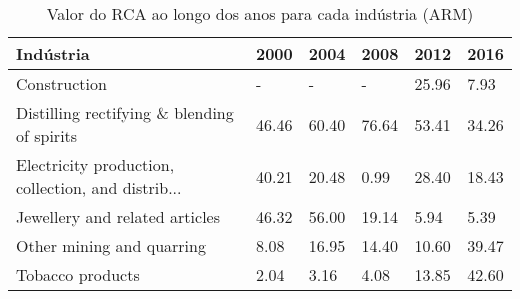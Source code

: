 \begin{table}
\centering
\caption{Valor do RCA ao longo dos anos para cada indústria (ARM)}
\label{tab:ex3-tempo-ARM}
\begin{tabular}{p{6cm}p{1.5cm}p{1.5cm}p{1.5cm}p{1.5cm}p{1.5cm}}
\toprule
                                         Indústria &  2000 &  2004 &  2008 &  2012 &  2016 \\
\midrule
                                      Construction &     - &     - &     - & 25.96 &  7.93 \\
       Distilling rectifying \& blending of spirits & 46.46 & 60.40 & 76.64 & 53.41 & 34.26 \\
Electricity production, collection, and distrib... & 40.21 & 20.48 &  0.99 & 28.40 & 18.43 \\
                    Jewellery and related articles & 46.32 & 56.00 & 19.14 &  5.94 &  5.39 \\
                         Other mining and quarring &  8.08 & 16.95 & 14.40 & 10.60 & 39.47 \\
                                  Tobacco products &  2.04 &  3.16 &  4.08 & 13.85 & 42.60 \\
\bottomrule
\end{tabular}
\end{table}
